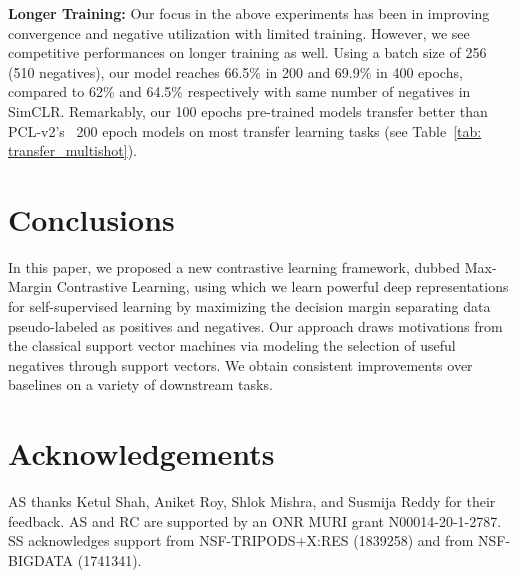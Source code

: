\documentclass[letterpaper]{article} \usepackage{aaai22}  \usepackage{times}  \usepackage{helvet}  \usepackage{courier}  \usepackage[hyphens]{url}  \usepackage{graphicx} \urlstyle{rm} \def\UrlFont{\rm}  \usepackage{natbib}  \usepackage{caption} \DeclareCaptionStyle{ruled}{labelfont=normalfont,labelsep=colon,strut=off} \frenchspacing  \setlength{\pdfpagewidth}{8.5in}  \setlength{\pdfpageheight}{11in}
\begin{document}
\textbf{Longer Training:}
 Our focus in the above experiments has been in improving convergence and negative utilization with limited training. However, we see competitive performances on longer training as well. Using a batch size of 256 (510 negatives), our model reaches 66.5\% in 200 and 69.9\% in 400 epochs, compared to 62\% and 64.5\% respectively with same number of negatives in SimCLR\cite{chen2020simple}. Remarkably, our 100 epochs pre-trained models transfer better than PCL-v2’s~\cite{li2020prototypical} 200 epoch models on most transfer learning tasks (see Table~\ref{tab: transfer_multishot}).
\\

\begin{figure}[]
    \centering
    \begin{minipage}{0.33\textwidth}
        \label{tab: mmcl_variants_compare}
    \end{minipage}
    \vspace*{-0.5cm}
\end{figure}


\vspace*{-0.5cm}

\section{Conclusions}
In this paper, we proposed a new contrastive learning framework, dubbed Max-Margin Contrastive Learning, using which we learn powerful deep representations for self-supervised learning by maximizing the decision margin separating data pseudo-labeled as positives and negatives. Our approach draws motivations from the classical support vector machines via modeling the selection of useful negatives through support vectors. We obtain consistent improvements over baselines on a variety of downstream tasks.

\section{Acknowledgements}
AS thanks Ketul Shah, Aniket Roy, Shlok Mishra, and Susmija Reddy for their feedback. AS and RC are supported by an ONR MURI grant N00014-20-1-2787. SS acknowledges support from NSF-TRIPODS+X:RES  (1839258) and from NSF-BIGDATA (1741341).
\end{document}
